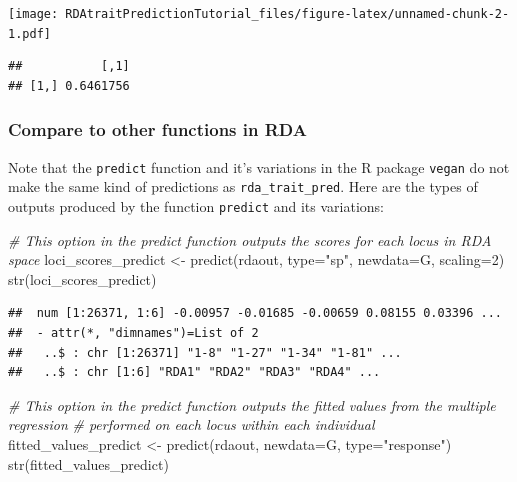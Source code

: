 \documentclass[
]{article}
\newenvironment{Shaded}{\begin{snugshade}}{\end{snugshade}}
\newcommand{\AttributeTok}[1]{\textcolor[rgb]{0.77,0.63,0.00}{#1}}
\newcommand{\CommentTok}[1]{\textcolor[rgb]{0.56,0.35,0.01}{\textit{#1}}}
\newcommand{\DecValTok}[1]{\textcolor[rgb]{0.00,0.00,0.81}{#1}}
\newcommand{\FunctionTok}[1]{\textcolor[rgb]{0.00,0.00,0.00}{#1}}
\newcommand{\NormalTok}[1]{#1}
\newcommand{\OtherTok}[1]{\textcolor[rgb]{0.56,0.35,0.01}{#1}}
\newcommand{\SpecialCharTok}[1]{\textcolor[rgb]{0.00,0.00,0.00}{#1}}
\newcommand{\StringTok}[1]{\textcolor[rgb]{0.31,0.60,0.02}{#1}}
\begin{document}
\texttt{[image: RDAtraitPredictionTutorial\_files/figure-latex/unnamed-chunk-2-1.pdf]}

\begin{Shaded}
\end{Shaded}

\begin{verbatim}
##           [,1]
## [1,] 0.6461756
\end{verbatim}

\hypertarget{compare-to-other-functions-in-rda}{%
\subsubsection{Compare to other functions in
RDA}\label{compare-to-other-functions-in-rda}}

Note that the \texttt{predict} function and it's variations in the R
package \texttt{vegan} do not make the same kind of predictions as
\texttt{rda\_trait\_pred}. Here are the types of outputs produced by the
function \texttt{predict} and its variations:

\begin{Shaded}
\begin{Highlighting}[]
\CommentTok{\# This option in the \textasciigrave{}predict\textasciigrave{} function outputs the scores for each locus in RDA space}
\NormalTok{loci\_scores\_predict }\OtherTok{\textless{}{-}} \FunctionTok{predict}\NormalTok{(rdaout, }\AttributeTok{type=}\StringTok{"sp"}\NormalTok{, }\AttributeTok{newdata=}\NormalTok{G, }\AttributeTok{scaling=}\DecValTok{2}\NormalTok{)}
\FunctionTok{str}\NormalTok{(loci\_scores\_predict)}
\end{Highlighting}
\end{Shaded}

\begin{verbatim}
##  num [1:26371, 1:6] -0.00957 -0.01685 -0.00659 0.08155 0.03396 ...
##  - attr(*, "dimnames")=List of 2
##   ..$ : chr [1:26371] "1-8" "1-27" "1-34" "1-81" ...
##   ..$ : chr [1:6] "RDA1" "RDA2" "RDA3" "RDA4" ...
\end{verbatim}

\begin{Shaded}
\begin{Highlighting}[]
\CommentTok{\# This option in the \textasciigrave{}predict\textasciigrave{} function outputs the fitted values from the multiple regression}
\CommentTok{\# performed on each locus within each individual }
\NormalTok{fitted\_values\_predict }\OtherTok{\textless{}{-}} \FunctionTok{predict}\NormalTok{(rdaout, }\AttributeTok{newdata=}\NormalTok{G, }\AttributeTok{type=}\StringTok{"response"}\NormalTok{)}
\FunctionTok{str}\NormalTok{(fitted\_values\_predict)}
\end{Highlighting}
\end{Shaded}
\end{document}
